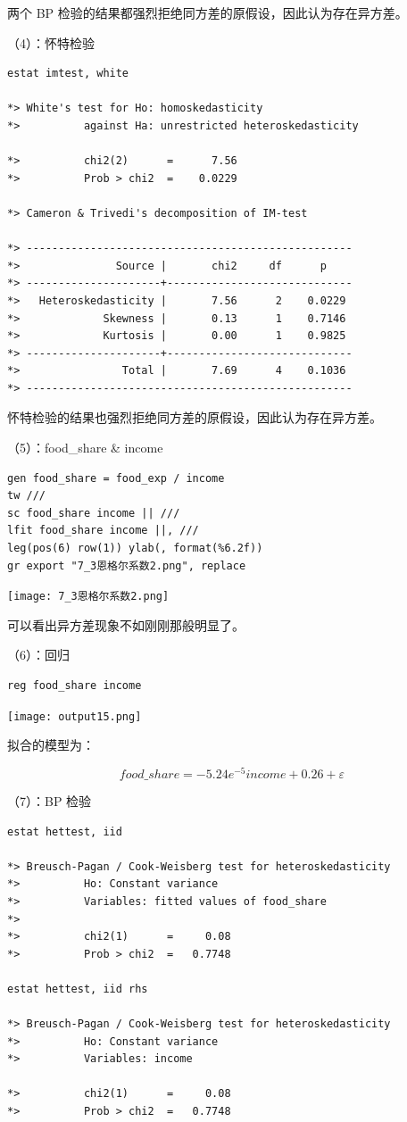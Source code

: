 \documentclass[cn,fancy,blue,11pt]{elegantbook}
\begin{document}
两个 BP 检验的结果都强烈拒绝同方差的原假设，因此认为存在异方差。

（4）：怀特检验

\begin{lstlisting}
estat imtest, white

*> White's test for Ho: homoskedasticity
*>          against Ha: unrestricted heteroskedasticity

*>          chi2(2)      =      7.56
*>          Prob > chi2  =    0.0229

*> Cameron & Trivedi's decomposition of IM-test

*> ---------------------------------------------------
*>               Source |       chi2     df      p
*> ---------------------+-----------------------------
*>   Heteroskedasticity |       7.56      2    0.0229
*>             Skewness |       0.13      1    0.7146
*>             Kurtosis |       0.00      1    0.9825
*> ---------------------+-----------------------------
*>                Total |       7.69      4    0.1036
*> ---------------------------------------------------
\end{lstlisting}

怀特检验的结果也强烈拒绝同方差的原假设，因此认为存在异方差。

（5）：food\_share \& income

\begin{lstlisting}
gen food_share = food_exp / income
tw ///
sc food_share income || ///
lfit food_share income ||, ///
leg(pos(6) row(1)) ylab(, format(%6.2f))
gr export "7_3恩格尔系数2.png", replace
\end{lstlisting}


\noindent\texttt{[image: 7\_3恩格尔系数2.png]}

可以看出异方差现象不如刚刚那般明显了。

（6）：回归

\begin{lstlisting}
reg food_share income
\end{lstlisting}

\noindent\texttt{[image: output15.png]}

拟合的模型为：

\begin{equation}
  food\_share = -5.24e^{-5}income + 0.26 + \varepsilon
\end{equation}

（7）：BP 检验

\begin{lstlisting}
estat hettest, iid

*> Breusch-Pagan / Cook-Weisberg test for heteroskedasticity
*>          Ho: Constant variance
*>          Variables: fitted values of food_share
*>
*>          chi2(1)      =     0.08
*>          Prob > chi2  =   0.7748

estat hettest, iid rhs

*> Breusch-Pagan / Cook-Weisberg test for heteroskedasticity
*>          Ho: Constant variance
*>          Variables: income

*>          chi2(1)      =     0.08
*>          Prob > chi2  =   0.7748
\end{lstlisting}
\end{document}
